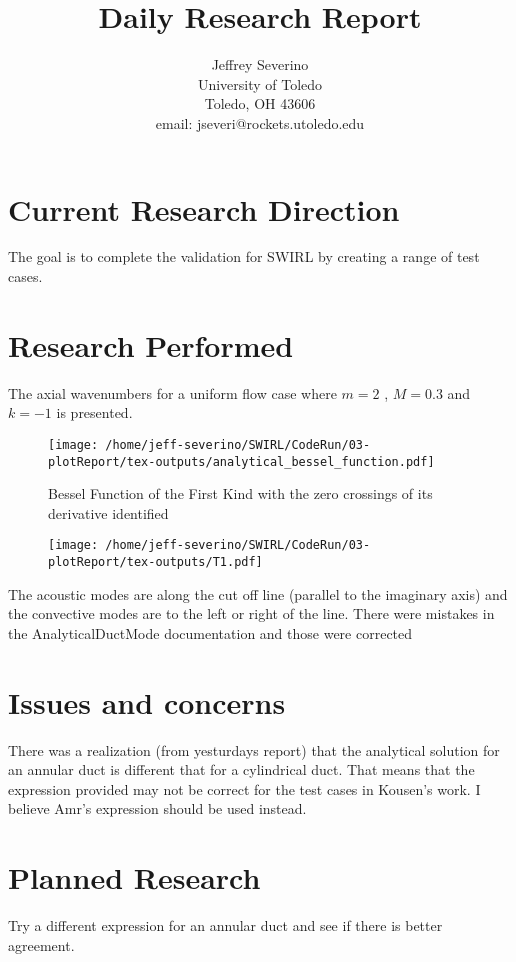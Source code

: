\documentclass[a4paper]{article}
\begin{document}
\begin{titlepage}

    \title{
    Daily Research Report}

    \author{ Jeffrey Severino \\
        University of Toledo \\
        Toledo, OH  43606 \\
    email: jseveri@rockets.utoledo.edu}


    \maketitle

\end{titlepage}
\section{Current Research Direction}
The goal is to complete the validation for SWIRL by creating a range of test
cases.
\section{Research Performed}
The axial wavenumbers for a uniform flow case where $m = 2$ , $M = 0.3$ and 
$k = -1$ is presented. 
 \begin{figure}
     \centering
     \texttt{[image: /home/jeff-severino/SWIRL/CodeRun/03-plotReport/tex-outputs/analytical\_bessel\_function.pdf]}
     \caption{Bessel Function of the First Kind with the zero crossings of its
     derivative identified}
 \end{figure}

 \begin{figure}[h!]
     \centering
     \texttt{[image: /home/jeff-severino/SWIRL/CodeRun/03-plotReport/tex-outputs/T1.pdf]}
 \end{figure}

 The acoustic modes are along the cut off line (parallel to the imaginary axis)
 and the convective modes are to the left or right of the line. There were 
 mistakes in the AnalyticalDuctMode documentation and those were corrected
\section{Issues and concerns}
There was a realization (from yesturdays report) that the analytical solution for an annular duct is different
that for a cylindrical duct. That means that the expression provided may not 
be correct for the test cases in Kousen's work. I believe Amr's expression should be
used instead.
\section{Planned Research}
Try a different expression for an annular duct and see if there is better agreement.
\end{document}
